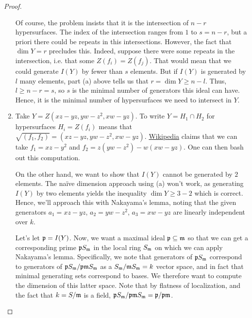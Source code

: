 \begin{proof}
\begin{enumerate}[label = (\alph*)]
        Of course, the problem insists that it is the intersection of $n - r$ hypersurfaces. The index of the intersection ranges from $1$ to $s = n - r$, but a priori there could be repeats in this intersections. However, the fact that $\dim Y = r$ precludes this. Indeed, suppose there were some repeats in the intersection, i.e. that some $Z(f_i) = Z(f_j)$. That would mean that we could generate $I(Y)$ by fewer than $s$ elements. But if $I(Y)$ is generated by $l$ many elements, part (a) above tells us that $r = \dim Y \geq n - l$. Thus, $l \geq n - r = s$, so $s$ is the minimal number of generators this ideal can have. Hence, it is the minimal number of hypersurfaces we need to intersect in $Y$.

        \item Take $Y = Z(xz - yz, yw - z^2, xw - yz)$. To write $Y = H_1 \cap H_2$ for hypersurfaces $H_i = Z(f_i)$ means that $\sqrt{(f_1, f_2)} = (xz - yz, yw - z^2, xw - yz)$. \href{https://en.wikipedia.org/wiki/Twisted_cubic}{Wikipedia} claims that we can take $f_1 = xz - y^2$ and $f_2 = z(yw - z^2) - w(xw - yz)$. One can then bash out this computation.

        On the other hand, we want to show that $I(Y)$ cannot be generated by $2$ elements. The na\"ive dimension approach using (a) won't work, as generating $I(Y)$ by two elements yields the inequality $\dim Y \geq 3 - 2$ which is correct. Hence, we'll approach this with Nakayama's lemma, noting that the given generators $a_1 = xz - yz$, $a_2 = yw - z^2$, $a_3 = xw - yz$ are linearly independent over $k$.

        Let's let $\mathfrak p = I(Y)$. Now, we want a maximal ideal $\mathfrak p \subseteq \mathfrak m$ so that we can get a corresponding prime $\mathfrak p S_\mathfrak m$ in the local ring $S_\mathfrak m$ on which we can apply Nakayama's lemma. Specifically, we note that generators of $\mathfrak p S_\mathfrak m$ correspond to generators of $\mathfrak p S_\mathfrak m / \mathfrak p \mathfrak m S_\mathfrak m$ as a $S_\mathfrak m / \mathfrak m S_\mathfrak m = k$ vector space, and in fact that minimal generating sets correspond to bases. We therefore want to compute the dimension of this latter space. Note that by flatness of localization, and the fact that $k = S/\mathfrak m$ is a field, $\mathfrak p S_\mathfrak m / \mathfrak p \mathfrak m S_\mathfrak m = \mathfrak p / \mathfrak p \mathfrak m$.


\end{enumerate}
\end{proof}
